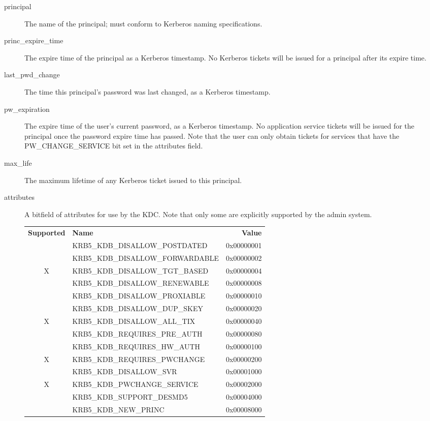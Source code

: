 \begin{description}
\item[principal] The name of the principal; must conform to Kerberos
naming specifications.

\item[princ_expire_time] The expire time of the principal as a Kerberos
timestamp.  No Kerberos tickets will be issued for a principal after
its expire time.

\item[last_pwd_change] The time this principal's password was last
changed, as a Kerberos timestamp.

\item[pw_expiration] The expire time of the user's current password, as a
Kerberos timestamp.  No application service tickets will be issued for the
principal once the password expire time has passed.  Note that the user can
only obtain tickets for services that have the PW_CHANGE_SERVICE bit set in
the attributes field.

\item[max_life] The maximum lifetime of any Kerberos ticket issued to
this principal.

\item[attributes] A bitfield of attributes for use by the KDC.  
Note that only some are explicitly supported by the admin system.

\begin{tabular}{clr}
{\bf Supported} & {\bf Name} & {\bf Value} \\
  & KRB5_KDB_DISALLOW_POSTDATED     & 0x00000001 \\
  & KRB5_KDB_DISALLOW_FORWARDABLE   & 0x00000002 \\
X & KRB5_KDB_DISALLOW_TGT_BASED     & 0x00000004 \\
  & KRB5_KDB_DISALLOW_RENEWABLE     & 0x00000008 \\
  & KRB5_KDB_DISALLOW_PROXIABLE     & 0x00000010 \\
  & KRB5_KDB_DISALLOW_DUP_SKEY      & 0x00000020 \\
X & KRB5_KDB_DISALLOW_ALL_TIX       & 0x00000040 \\
  & KRB5_KDB_REQUIRES_PRE_AUTH      & 0x00000080 \\
  & KRB5_KDB_REQUIRES_HW_AUTH       & 0x00000100 \\
X & KRB5_KDB_REQUIRES_PWCHANGE      & 0x00000200 \\
  & KRB5_KDB_DISALLOW_SVR           & 0x00001000 \\
X & KRB5_KDB_PWCHANGE_SERVICE       & 0x00002000 \\
  & KRB5_KDB_SUPPORT_DESMD5         & 0x00004000 \\
  & KRB5_KDB_NEW_PRINC              & 0x00008000
\end{tabular}


\end{description}
